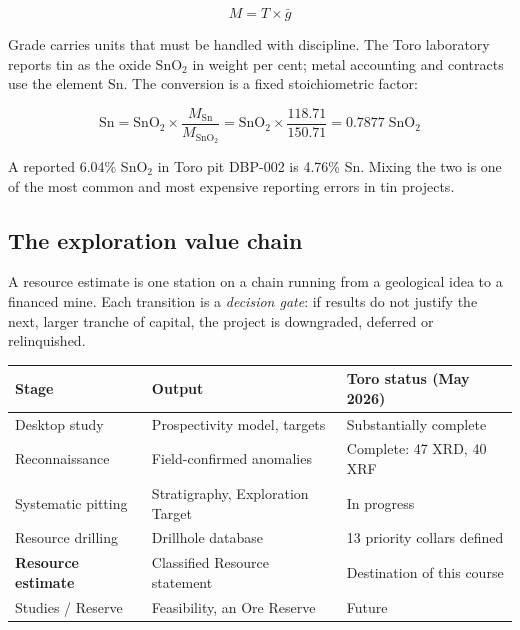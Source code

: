\documentclass[11pt]{article}
\begin{document}
\begin{eqbox}
\[ M = T \times \bar{g} \tag{1.1}\]
\end{eqbox}

Grade carries units that must be handled with discipline. The Toro
laboratory reports tin as the oxide SnO$_2$ in weight per cent; metal
accounting and contracts use the element Sn. The conversion is a fixed
stoichiometric factor:

\begin{eqbox}
\[ \mathrm{Sn} = \mathrm{SnO_2}\times\frac{M_{\mathrm{Sn}}}{M_{\mathrm{SnO_2}}}
   = \mathrm{SnO_2}\times\frac{118.71}{150.71}
   = 0.7877\;\mathrm{SnO_2} \tag{1.2}\]
\end{eqbox}

A reported 6.04\% SnO$_2$ in Toro pit DBP-002 is 4.76\% Sn. Mixing the
two is one of the most common and most expensive reporting errors in
tin projects.

\subsection{The exploration value chain}

A resource estimate is one station on a chain running from a geological
idea to a financed mine. Each transition is a \emph{decision gate}: if
results do not justify the next, larger tranche of capital, the project
is downgraded, deferred or relinquished.

\begin{center}\small
\begin{tabular}{@{}p{4.6cm}p{4.6cm}p{4.6cm}@{}}
\toprule
\textbf{Stage} & \textbf{Output} & \textbf{Toro status (May 2026)}\\
\midrule
Desktop study & Prospectivity model, targets & Substantially complete\\
Reconnaissance & Field-confirmed anomalies & Complete: 47 XRD, 40 XRF\\
Systematic pitting & Stratigraphy, Exploration Target & In progress\\
Resource drilling & Drillhole database & 13 priority collars defined\\
\textbf{Resource estimate} & Classified Resource statement & Destination
of this course\\
Studies / Reserve & Feasibility, an Ore Reserve & Future\\
\bottomrule
\end{tabular}
\end{center}
\end{document}
